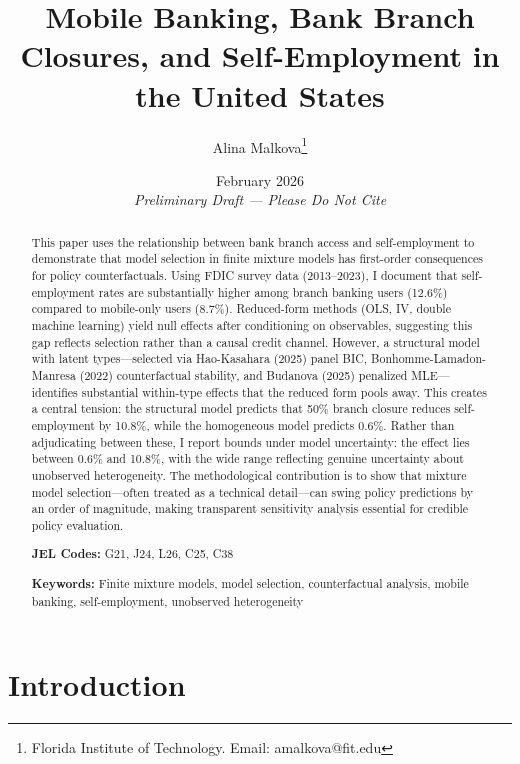 \documentclass[12pt]{article}
\title{Mobile Banking, Bank Branch Closures, and Self-Employment in the United States}
\author{Alina Malkova\thanks{Florida Institute of Technology. Email: amalkova@fit.edu}}
\date{February 2026 \\ \textit{Preliminary Draft --- Please Do Not Cite}}
\begin{document}
\maketitle

\begin{abstract}
\noindent This paper uses the relationship between bank branch access and self-employment to demonstrate that model selection in finite mixture models has first-order consequences for policy counterfactuals. Using FDIC survey data (2013--2023), I document that self-employment rates are substantially higher among branch banking users (12.6\%) compared to mobile-only users (8.7\%). Reduced-form methods (OLS, IV, double machine learning) yield null effects after conditioning on observables, suggesting this gap reflects selection rather than a causal credit channel. However, a structural model with latent types---selected via Hao-Kasahara (2025) panel BIC, Bonhomme-Lamadon-Manresa (2022) counterfactual stability, and Budanova (2025) penalized MLE---identifies substantial within-type effects that the reduced form pools away. This creates a central tension: the structural model predicts that 50\% branch closure reduces self-employment by 10.8\%, while the homogeneous model predicts 0.6\%. Rather than adjudicating between these, I report bounds under model uncertainty: the effect lies between 0.6\% and 10.8\%, with the wide range reflecting genuine uncertainty about unobserved heterogeneity. The methodological contribution is to show that mixture model selection---often treated as a technical detail---can swing policy predictions by an order of magnitude, making transparent sensitivity analysis essential for credible policy evaluation.

\vspace{0.5cm}
\noindent \textbf{JEL Codes:} G21, J24, L26, C25, C38

\vspace{0.3cm}
\noindent \textbf{Keywords:} Finite mixture models, model selection, counterfactual analysis, mobile banking, self-employment, unobserved heterogeneity
\end{abstract}

\newpage

\section{Introduction}
\end{document}
